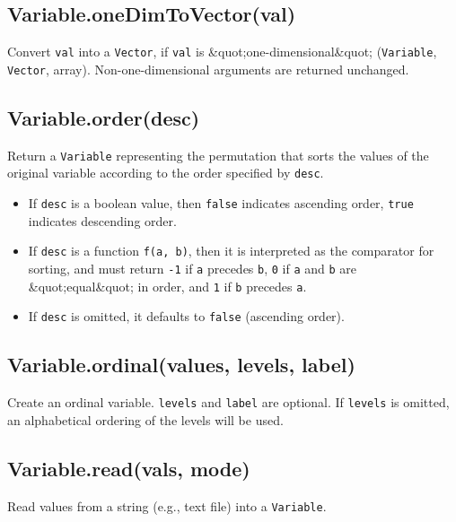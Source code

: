 \documentclass{article}
\begin{document}
    \subsection*{Variable.oneDimToVector(val)}
    Convert \texttt{val} into a \texttt{Vector}, if \texttt{val} is \&quot;one-dimensional\&quot;
(\texttt{Variable}, \texttt{Vector}, array).
Non-one-dimensional arguments are returned unchanged.


    \subsection*{Variable.order(desc)}
    Return a \texttt{Variable} representing the permutation that sorts the values of the
original variable according to the order specified by \texttt{desc}.


\begin{itemize}

\item If \texttt{desc} is a boolean value, then \texttt{false} indicates ascending order, \texttt{true}
indicates descending order.

\item If \texttt{desc} is a function \texttt{f(a, b)}, then it is interpreted as the comparator
for sorting, and must return \texttt{-1} if \texttt{a} precedes \texttt{b}, \texttt{0} if \texttt{a} and \texttt{b} are \&quot;equal\&quot;
in order, and \texttt{1} if \texttt{b} precedes \texttt{a}.

\item If \texttt{desc} is omitted, it defaults to \texttt{false} (ascending order).

\end{itemize}

    \subsection*{Variable.ordinal(values, levels, label)}
    Create an ordinal variable. \texttt{levels} and \texttt{label} are optional. If \texttt{levels}
is omitted, an alphabetical ordering of the levels will be used.


    \subsection*{Variable.read(vals, mode)}
    Read values from a string (e.g., text file) into a \texttt{Variable}.
\end{document}
